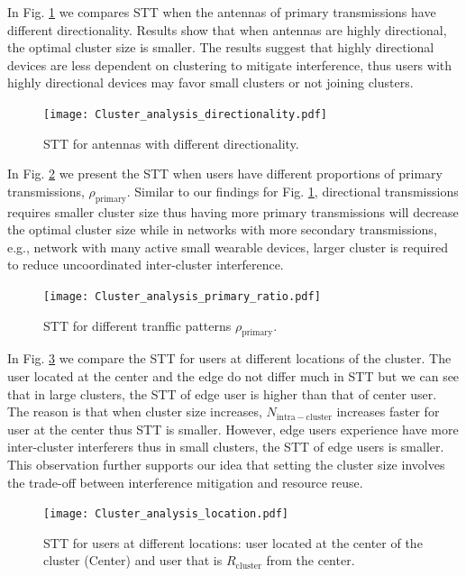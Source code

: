 \documentclass[10pt, conference, letterpaper]{IEEEtran}
\begin{document}
In Fig. \ref{fig:clusteranalysis:directionality} we compares STT when the antennas of primary transmissions have different directionality. Results show that when antennas are highly directional, the optimal cluster size is smaller. The results suggest that highly directional devices are less dependent on clustering to mitigate interference, thus users with highly directional devices may favor small clusters or not joining clusters. 
\begin{figure}
	\centering
	\texttt{[image: Cluster\_analysis\_directionality.pdf]}
	\caption{STT for antennas with different directionality.}
	\label{fig:clusteranalysis:directionality}
\end{figure}

In Fig. \ref{fig:clusteranalysis:primary_ratio} we present the STT when users have different proportions of primary transmissions, $\rho_{\mathrm{primary}}$. Similar to our findings for Fig. \ref{fig:clusteranalysis:directionality}, directional transmissions requires smaller cluster size thus having more primary transmissions will decrease the optimal cluster size while in networks with more secondary transmissions, e.g., network with many active small wearable devices, larger cluster is required to reduce uncoordinated inter-cluster interference. 

\begin{figure}
	\centering
	\texttt{[image: Cluster\_analysis\_primary\_ratio.pdf]}
	\caption{STT for different tranffic patterns $\rho_{\mathrm{primary}}$.}
	\label{fig:clusteranalysis:primary_ratio}
\end{figure}

In Fig. \ref{fig:clusteranalysis:location} we compare the STT for users at different locations of the cluster.
The user located at the center and the edge do not differ much in STT but we can see that in large clusters, the STT of edge user is higher than that of center user. The reason is that when cluster size increases, $N_{\mathrm{intra-cluster}}$ increases faster for user at the center thus STT is smaller. However, edge users experience have more inter-cluster interferers thus in small clusters, the STT of edge users is smaller. This observation further supports our idea that setting the cluster size involves the trade-off between interference mitigation and resource reuse.

\begin{figure}
	\centering
	\texttt{[image: Cluster\_analysis\_location.pdf]}
	\caption{STT for users at different locations: user located at the center of the cluster (Center) and user that is $R_{\mathrm{cluster}}$ from the center.}
	\label{fig:clusteranalysis:location}
\end{figure}
\end{document}
